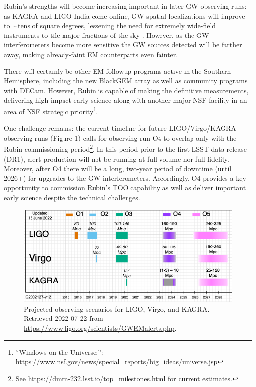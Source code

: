 \documentclass[DM,authoryear,toc]{lsstdoc}
\begin{document}
Rubin's strengths will become increasing important in later GW observing runs: 
as KAGRA and LIGO-India come online, GW spatial localizations will improve to $\sim$tens of square degrees, lessening the need for extremely wide-field instruments to tile major fractions of the sky \citep{2022ApJ...924...54P}.  
However, as the GW interferometers become more sensitive the GW sources detected will be farther away, making already-faint EM counterparts even fainter.

There will certainly be other EM followup programs active in the Southern Hemisphere, including the new BlackGEM array as well as community programs with DECam.
However, Rubin is capable of making the definitive measurements, delivering high-impact early science along with another major NSF facility in an area of NSF strategic priority\footnote{``Windows on the Universe:'': \url{https://www.nsf.gov/news/special_reports/big_ideas/universe.jsp}}.

One challenge remains: the current timeline for future LIGO/Virgo/KAGRA observing runs (Figure \ref{fig:scenarios}) calls for observing run O4 to overlap only with the Rubin commissioning period\footnote{See \url{https://dmtn-232.lsst.io/top_milestones.html} for current estimates.}.
In this period prior to the first LSST data release (DR1), alert production will not be running at full volume nor full fidelity.
Moreover, after O4 there will be a long, two-year period of downtime (until 2026+) for upgrades to the GW interferometers.  
Accordingly, O4 provides a key opportunity to commission Rubin's TOO capability as well as deliver important early science despite the technical challenges.

\begin{figure}
\includegraphics[width=\textwidth]{figures/LVK_run_plan_220615.png}
\caption{Projected observing scenarios for LIGO, Virgo, and KAGRA.  Retrieved 2022-07-22 from 
\url{https://www.ligo.org/scientists/GWEMalerts.php}.
	\label{fig:scenarios}}
\end{figure}
\end{document}
